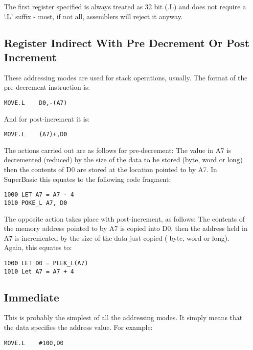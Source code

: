 The first register specified is always treated as 32 bit (.L) and
      does not require a `.L' suffix -{} most, if not all, assemblers will
      reject it anyway.

\subsection{Register Indirect With Pre Decrement Or Post Increment}\address{Register Indirect With Pre Decrement Or Post Increment}

These addressing modes are used for stack operations, usually. The
      format of the pre-{}decrement instruction is: 
\begin{lstlisting}[firstnumber=1,]
          MOVE.L    D0,-(A7) 
\end{lstlisting}
       And for post-{}increment it is: 
\begin{lstlisting}[firstnumber=1,]
          MOVE.L    (A7)+,D0 
\end{lstlisting}


The actions carried out are as follows for pre-{}decrement: The
      value in A7 is decremented (reduced) by the size of the data to be
      stored (byte, word or long) then the contents of D0 are stored at the
      location pointed to by A7. In SuperBasic this equates to the following
      code fragment: 
\begin{lstlisting}[firstnumber=1,language={[Visual]Basic}]
1000 LET A7 = A7 - 4
1010 POKE_L A7, D0 
\end{lstlisting}


The opposite action takes place with post-{}increment, as follows:
      The contents of the memory address pointed to by A7 is copied into D0,
      then the address held in A7 is incremented by the size of the data just
      copied ( byte, word or long). Again, this equates to: 
\begin{lstlisting}[firstnumber=1,language={}]
1000 LET D0 = PEEK_L(A7)
1010 Let A7 = A7 + 4 
\end{lstlisting}


\subsection{Immediate}\address{Immediate}

This is probably the simplest of all the addressing modes. It
      simply means that the data specifies the address value. For example:
 
\begin{lstlisting}[firstnumber=1,]
          MOVE.L    #100,D0 
\end{lstlisting}


